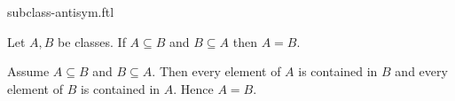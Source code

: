 \documentclass{article}
\begin{document}
\begin{smodule}{subclass-antisym.ftl}

  \begin{fproposition*}[label=7159957847801856]
    Let $A, B$ be classes.
    If $A \subseteq B$ and $B \subseteq A$ then $A = B$.
  \end{fproposition*}
  \begin{fproof*}
    Assume $A \subseteq B$ and $B \subseteq A$.
    Then every element of $A$ is contained in $B$ and every element of $B$ is contained in $A$.
    Hence $A = B$.
  \end{fproof*}
\end{smodule}
\end{document}
